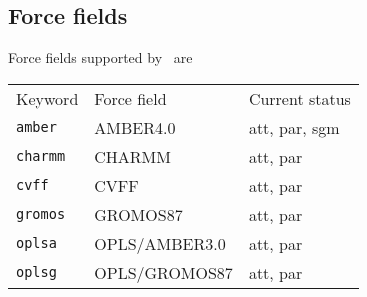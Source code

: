 \subsection{Force fields}
\label{sec:nwaforcefields}
Force fields supported by \nwargos\ are
\begin{center}
\begin{tabular}{lll}
\hline
Keyword      & Force field   & Current status \\
{\tt amber}  & AMBER4.0      & att, par, sgm  \\
{\tt charmm} & CHARMM        & att, par       \\
{\tt cvff}   & CVFF          & att, par       \\
{\tt gromos} & GROMOS87      & att, par       \\
{\tt oplsa}  & OPLS/AMBER3.0 & att, par       \\
{\tt oplsg}  & OPLS/GROMOS87 & att, par       \\
\hline
\end{tabular}
\end{center}  


